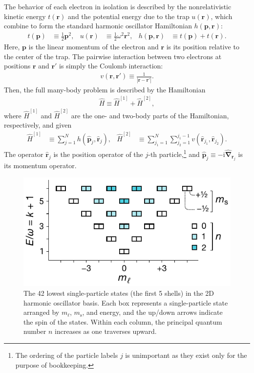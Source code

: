 The behavior of each electron in isolation is described by the
nonrelativistic kinetic energy $t(\bm{r})$ and the potential energy
due to the trap $u(\bm{r})$, which combine to form the standard
harmonic oscillator Hamiltonian $h(\bm{p}, \bm{r})$:
\begin{align*}
  t(\bm{p}) &\equiv \frac{1}{2} \bm{p}^2, &
  u(\bm{r}) &\equiv \frac{1}{2} \omega^2 \bm{r}^2, &
  h(\bm{p}, \bm{r}) &\equiv t(\bm{p}) + t(\bm{r}).
\end{align*}
Here, $\bm{p}$ is the linear momentum of the electron and $\bm{r}$ is
its position relative to the center of the trap.  The pairwise
interaction between two electrons at positions $\bm{r}$ and $\bm{r}'$
is simply the Coulomb interaction:
\begin{align*}
  v(\bm{r}, \bm{r}') \equiv \frac{1}{|\bm{r} - \bm{r}'|}.
\end{align*}
Then, the full many-body problem is described by the Hamiltonian
\begin{align*}
  \hat H \equiv \hat H^{[1]} + \hat H^{[2]},
\end{align*}
where $\hat{H}^{[1]}$ and $\hat{H}^{[2]}$ are the one- and two-body parts of the Hamiltonian, respectively, and given 
\begin{align} \label{eq:onetwobodyhamiltonian}
\hat{H}^{[1]} &\equiv \sum_{j = 1}^N h(\hat{\bm p}_j, \hat{\bm r}_j), &
\hat{H}^{[2]} &\equiv \sum_{j_1 = 1}^N \sum_{j_2 = 1}^{j_1 - 1} v(\hat{\bm r}_{j_1}, \hat{\bm r}_{j_2}).
\end{align}
The operator $\hat{\bm r}_j$ is the position operator of the $j$-th
particle,\footnote{The ordering of the particle labels $j$ is
unimportant as they exist only for the purpose of bookkeeping.} and
$\hat{\bm p}_j \equiv -\mathrm{i} \hat{\bm{\nabla}}_{\bm{r}_j}$ is its
momentum operator.

\begin{figure}
  \includegraphics{figures/fig-shell-structure-v2.pdf} \caption{The 42
  lowest single-particle states (the first 5 shells) in the 2D
  harmonic oscillator basis.  Each box represents a single-particle
  state arranged by $m_\ell$, $m_{\mathrm{s}}$, and energy, and the
  up/down arrows indicate the spin of the states.  Within each column,
  the principal quantum number $n$ increases as one traverses
  upward.}  \label{fig:shell-structure}
\end{figure}

